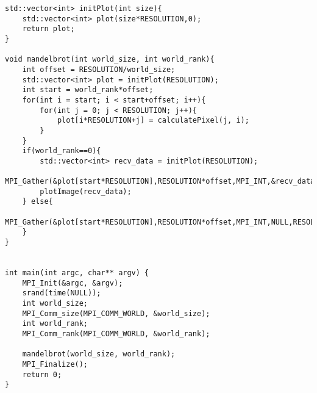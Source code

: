\documentclass[12pt]{article}
\begin{document}
\begin{verbatim}
std::vector<int> initPlot(int size){
	std::vector<int> plot(size*RESOLUTION,0);
	return plot;
}

void mandelbrot(int world_size, int world_rank){
	int offset = RESOLUTION/world_size;
	std::vector<int> plot = initPlot(RESOLUTION);
	int start = world_rank*offset;
	for(int i = start; i < start+offset; i++){
		for(int j = 0; j < RESOLUTION; j++){
			plot[i*RESOLUTION+j] = calculatePixel(j, i);
		}
	}
	if(world_rank==0){
		std::vector<int> recv_data = initPlot(RESOLUTION);
		MPI_Gather(&plot[start*RESOLUTION],RESOLUTION*offset,MPI_INT,&recv_data.front(),RESOLUTION*offset,MPI_INT,0,MPI_COMM_WORLD);
		plotImage(recv_data);
	} else{
		MPI_Gather(&plot[start*RESOLUTION],RESOLUTION*offset,MPI_INT,NULL,RESOLUTION*offset,MPI_INT,0,MPI_COMM_WORLD);
	}
}


int main(int argc, char** argv) {
	MPI_Init(&argc, &argv);
	srand(time(NULL));
	int world_size;
	MPI_Comm_size(MPI_COMM_WORLD, &world_size);
	int world_rank;
	MPI_Comm_rank(MPI_COMM_WORLD, &world_rank);

	mandelbrot(world_size, world_rank);
	MPI_Finalize();
	return 0;
}

\end{verbatim}
\end{document}
